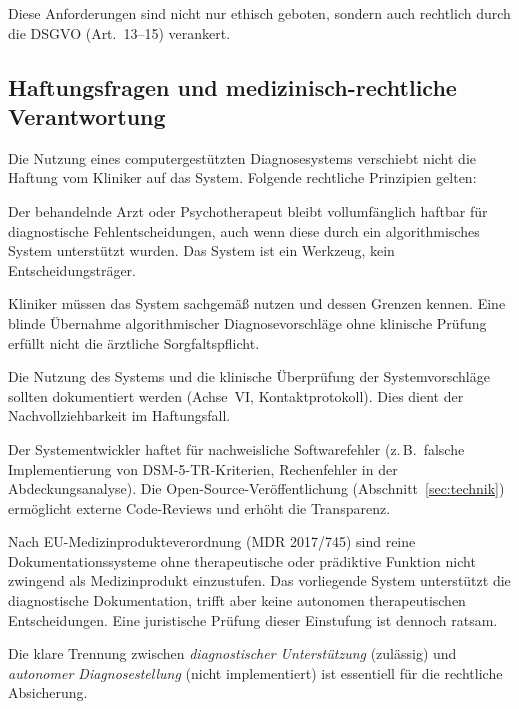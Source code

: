 \documentclass[11pt,a4paper]{article}
\begin{document}
Diese Anforderungen sind nicht nur ethisch geboten, sondern auch rechtlich durch die DSGVO (Art.~13--15) verankert.

\subsection{Haftungsfragen und medizinisch-rechtliche Verantwortung}

Die Nutzung eines computergest\"utzten Diagnosesystems verschiebt nicht die Haftung vom Kliniker auf das System. Folgende rechtliche Prinzipien gelten:

\begin{description}[style=nextline, leftmargin=1.5cm, font=\bfseries]
\item[Behandler-Haftung bleibt bestehen] Der behandelnde Arzt oder Psychotherapeut bleibt vollumf\"anglich haftbar f\"ur diagnostische Fehlentscheidungen, auch wenn diese durch ein algorithmisches System unterst\"utzt wurden. Das System ist ein Werkzeug, kein Entscheidungstr\"ager.
\item[Sorgfaltspflicht bei Systemnutzung] Kliniker m\"ussen das System sachgem\"a\ss{} nutzen und dessen Grenzen kennen. Eine blinde \"Ubernahme algorithmischer Diagnosevorschl\"age ohne klinische Pr\"ufung erf\"ullt nicht die \"arztliche Sorgfaltspflicht.
\item[Dokumentationspflicht] Die Nutzung des Systems und die klinische \"Uberpr\"ufung der Systemvorschl\"age sollten dokumentiert werden (Achse~VI, Kontaktprotokoll). Dies dient der Nachvollziehbarkeit im Haftungsfall.
\item[Produkthaftung des Entwicklers] Der Systementwickler haftet f\"ur nachweisliche Softwarefehler (z.\,B.\ falsche Implementierung von DSM-5-TR-Kriterien, Rechenfehler in der Abdeckungsanalyse). Die Open-Source-Ver\"offentlichung (Abschnitt~\ref{sec:technik}) erm\"oglicht externe Code-Reviews und erh\"oht die Transparenz.
\item[Keine Zulassung als Medizinprodukt erforderlich?] Nach EU-Medizinprodukteverordnung (MDR 2017/745) sind reine Dokumentationssysteme ohne therapeutische oder pr\"adiktive Funktion nicht zwingend als Medizinprodukt einzustufen. Das vorliegende System unterst\"utzt die diagnostische Dokumentation, trifft aber keine autonomen therapeutischen Entscheidungen. Eine juristische Pr\"ufung dieser Einstufung ist dennoch ratsam.
\end{description}

Die klare Trennung zwischen \textit{diagnostischer Unterst\"utzung} (zul\"assig) und \textit{autonomer Diagnosestellung} (nicht implementiert) ist essentiell f\"ur die rechtliche Absicherung.
\end{document}
